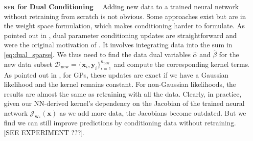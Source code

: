 \documentclass{article}
\renewcommand{\paragraph}[1]{{\bf #1}~~}
\newcommand{\our}{\textsc{sfr}\xspace}
\newcommand{\weights}{\ensuremath{\mathbf{w}}}
\newcommand{\mbf}[1]{\mathbf{#1}}
\newcommand{\MB}{\mbf{B}}
\newcommand{\MZ}{\mbf{Z}}
\newcommand{\T}{\top}
\newcommand{\vz}{\mbf{z}}
\newcommand{\vu}{\mbf{u}}
\newcommand{\vx}{\mbf{x}}
\newcommand{\vy}{\mbf{y}}
\newcommand{\vw}{\mbf{w}}
\newcommand{\Jac}[2]{\mathcal{J}_{#1}(#2)}
\DeclareMathOperator*{\argmin}{arg\,min}
\begin{document}
\paragraph{\our for Dual Conditioning} Adding new data to a trained neural network without retraining from scratch is not obvious. Some approaches exist \citep{kirsch2022marginal, spiegelhalter1990sequential} but are in the weight space formulation, which makes conditioning harder to formulate. As pointed out in \citet{chang2022fantasizing}, dual parameter conditioning updates are straightforward and were the original motivation of \citep{csato2002sparse}. It involves integrating data into the sum in \cref{eq:dual_sparse}. We thus need to find the data dual variables $\hat{\alpha}$ and $\hat{\beta}$ for the new data subset $\mathcal{D}_\textrm{new} = \{\vx_i,\vy_i\}_{i=1}^{n_{\textrm{new}}}$ and compute the corresponding kernel terms. As pointed out in \citet{chang2022fantasizing}, for GPs, these updates are exact if we have a Gaussian likelihood and the kernel remains constant. For non-Gaussian likelihoods, the results are almost the same as retraining with all the data. Clearly, in practice, given our NN-derived kernel's dependency on the Jacobian of the trained neural network $\Jac{\weights_*}{\vx}$ as we add more data, the Jacobians become outdated. But we find we can still improve predictions by conditioning data without retraining. [SEE EXPERIMENT ???].
\end{document}
